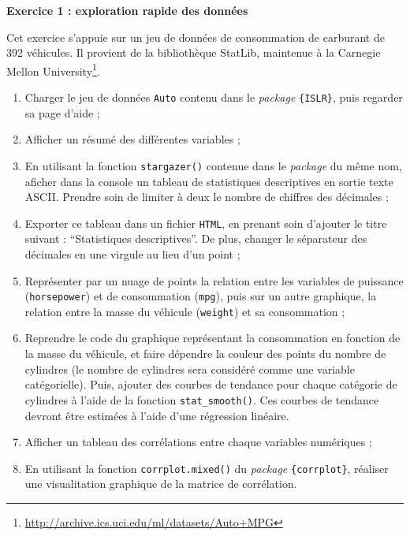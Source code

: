 \documentclass[
  11pt,
]{book}
\makeatletter
\providecommand{\tightlist}{%
  \setlength{\itemsep}{0pt}\setlength{\parskip}{0pt}}
\numberwithin{equation}{section}
\numberwithin{countremarque}{section}
\newenvironment{exframe}{%
 \def\at@end@of@exframe{}%
 \ifinner\ifhmode%
  \def\at@end@of@exframe{\end{minipage}}%
  \begin{minipage}{\columnwidth}%
 \fi\fi%
 \def\FrameCommand##1{\hskip\@totalleftmargin \hskip-\fboxsep
 \colorbox{shadecolorex}{##1}\hskip-\fboxsep
     \hskip-\linewidth \hskip-\@totalleftmargin \hskip\columnwidth}%
 \MakeFramed {\advance\hsize-\width
   \@totalleftmargin\z@ \linewidth\hsize
   \@setminipage}}%
 {\par\unskip\endMakeFramed%
 \at@end@of@exframe}
\makeatother
\begin{document}
\begin{exframe}
\textbf{Exercice 1 : exploration rapide des données}

Cet exercice s'appuie sur un jeu de données de consommation de carburant de 392 véhicules. Il provient de la bibliothèque StatLib, maintenue à la Carnegie Mellon University\footnote{\url{http://archive.ics.uci.edu/ml/datasets/Auto+MPG}}.

\begin{enumerate}
\def\labelenumi{\arabic{enumi}.}
\tightlist
\item
  Charger le jeu de données \texttt{Auto} contenu dans le \emph{package} \texttt{\{ISLR\}}, puis regarder sa page d'aide ;
\item
  Afficher un résumé des différentes variables ;
\item
  En utilisant la fonction \texttt{stargazer()} contenue dans le \emph{package} du même nom, aficher dans la console un tableau de statistiques descriptives en sortie texte ASCII. Prendre soin de limiter à deux le nombre de chiffres des décimales ;
\item
  Exporter ce tableau dans un fichier \texttt{HTML}, en prenant soin d'ajouter le titre suivant : ``Statistiques descriptives''. De plus, changer le séparateur des décimales en une virgule au lieu d'un point ;
\item
  Représenter par un nuage de points la relation entre les variables de puissance (\texttt{horsepower}) et de consommation (\texttt{mpg}), puis sur un autre graphique, la relation entre la masse du véhicule (\texttt{weight}) et sa consommation ;
\item
  Reprendre le code du graphique représentant la consommation en fonction de la masse du véhicule, et faire dépendre la couleur des points du nombre de cylindres (le nombre de cylindres sera considéré comme une variable catégorielle). Puis, ajouter des courbes de tendance pour chaque catégorie de cylindres à l'aide de la fonction \texttt{stat\_smooth()}. Ces courbes de tendance devront être estimées à l'aide d'une régression linéaire.
\item
  Afficher un tableau des corrélations entre chaque variables numériques ;
\item
  En utilisant la fonction \texttt{corrplot.mixed()} du \emph{package} \texttt{\{corrplot\}}, réaliser une visualitation graphique de la matrice de corrélation.
\end{enumerate}
\end{exframe}
\end{document}
